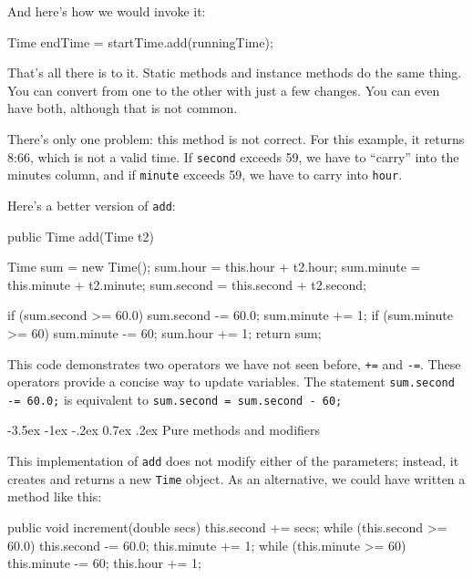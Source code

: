 \documentclass[12pt]{book}
\makeatletter
\theoremstyle{exercise}
\newcommand{\java}[1]{\verb"#1"}
\renewcommand{\section}{\@startsection{section}{1}{\z@}%
    {-3.5ex \@plus -1ex \@minus -.2ex}%
    {0.7ex \@plus.2ex}%
    {\normalfont\Large\bfseries}}
\newcommand{\java}[1]{\lstinline{#1}} %
\makeatother
\begin{document}
And here's how we would invoke it:

\begin{code}
    Time endTime = startTime.add(runningTime);
\end{code}

That's all there is to it.
Static methods and instance methods do the same thing.
You can convert from one to the other with just a few changes.
You can even have both, although that is not common.

There's only one problem: this method is not correct.
For this example, it returns 8:66, which is not a valid time.
If \java{second} exceeds 59, we have to ``carry'' into the minutes column, and if \java{minute} exceeds 59, we have to carry into \java{hour}.

Here's a better version of \java{add}:

\begin{code}
    public Time add(Time t2) {
        Time sum = new Time();
        sum.hour = this.hour + t2.hour;
        sum.minute = this.minute + t2.minute;
        sum.second = this.second + t2.second;

        if (sum.second >= 60.0) {
            sum.second -= 60.0;
            sum.minute += 1;
        }
        if (sum.minute >= 60) {
            sum.minute -= 60;
            sum.hour += 1;
        }
        return sum;
    }
\end{code}


This code demonstrates two operators we have not seen before, \java{+=} and \java{-=}.
These operators provide a concise way to update variables.
The statement \java{sum.second -= 60.0;} is equivalent to \java{sum.second = sum.second - 60;}


\section{Pure methods and modifiers}

This implementation of \java{add} does not modify either of the parameters; instead, it creates and returns a new \java{Time} object.
As an alternative, we could have written a method like this:

\begin{code}
    public void increment(double secs) {
        this.second += secs;
        while (this.second >= 60.0) {
            this.second -= 60.0;
            this.minute += 1;
        }
        while (this.minute >= 60) {
            this.minute -= 60;
            this.hour += 1;
        }
    }
\end{code}
\end{document}
